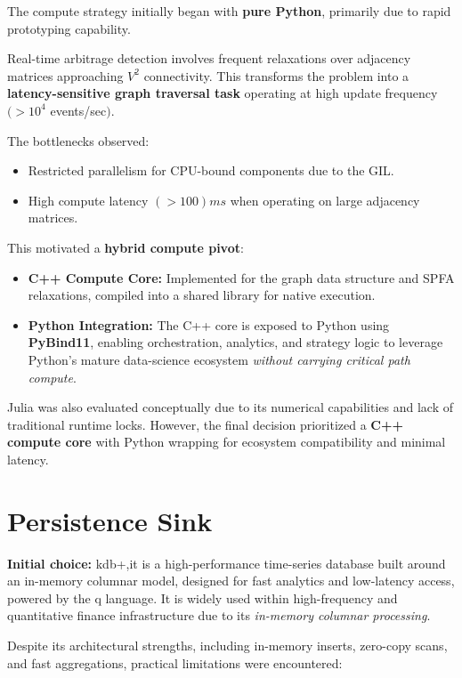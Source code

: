 \documentclass[letterpaper,11pt]{report}
\begin{document}
The compute strategy initially began with \textbf{pure Python}, primarily due to rapid prototyping capability.


Real-time arbitrage detection involves frequent relaxations over adjacency matrices approaching \(V^2\) connectivity. This transforms the problem into a \textbf{latency-sensitive graph traversal task} operating at high update frequency \((>10^4\) events/sec\().\)

The bottlenecks observed:

\begin{itemize}

    \item Restricted parallelism for CPU-bound components due to the GIL.
    \item High compute latency $(>100) ms$ when operating on large adjacency matrices.
\end{itemize}

This motivated a \textbf{hybrid compute pivot}:

\begin{itemize}
    \item \textbf{C++ Compute Core:} Implemented for the graph data structure and SPFA relaxations, compiled into a shared library for native execution.
    \item \textbf{Python Integration:} The C++ core is exposed to Python using \textbf{PyBind11}, enabling orchestration, analytics, and strategy logic to leverage Python’s mature data-science ecosystem \emph{without carrying critical path compute}.
\end{itemize}

Julia was also evaluated conceptually due to its numerical capabilities and lack of traditional runtime locks. However, the final decision prioritized a \textbf{C++ compute core} with Python wrapping for ecosystem compatibility and minimal latency.


\section{Persistence Sink}

\textbf{Initial choice:} kdb+,it is a high-performance time-series database built around an in-memory columnar model, designed for fast analytics and low-latency access, powered by the q language. It is widely used within high-frequency and quantitative finance infrastructure due to its \emph{in-memory columnar processing}.

Despite its architectural strengths, including in-memory inserts, zero-copy scans, and fast aggregations, practical limitations were encountered:
\end{document}
